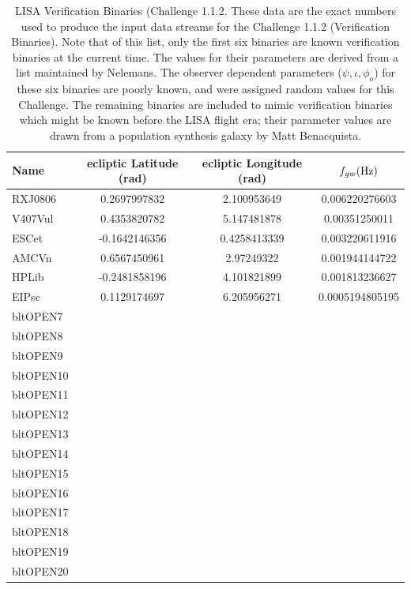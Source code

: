 \documentclass[11pt]{report}
\begin{document}
\begin{description}
\begin{center}
\begin{table}
\begin{tabular}{|l|c|c|c|}
\hline \textbf{Name} & {\bf ecliptic Latitude (rad)} & {\bf ecliptic
Longitude (rad)} & $f_{gw} ({\rm Hz})$  \\
\hline 
RXJ0806   & 0.2697997832   &  2.100953649   &   0.006220276603  \\
V407Vul   & 0.4353820782   &  5.147481878   &   0.00351250011   \\
ESCet   & -0.1642146356   & 0.4258413339   &   0.003220611916   \\
AMCVn   & 0.6567450961   &   2.97249322   &   0.001944144722   \\
HPLib   & -0.2481858196   &  4.101821899   &  0.001813236627   \\
EIPsc   & 0.1129174697   &  6.205956271   &  0.0005194805195   \\
\hline
bltOPEN7 & & & \\
bltOPEN8 & & & \\
bltOPEN9 & & & \\
bltOPEN10 & & & \\
bltOPEN11 & & & \\
bltOPEN12 & & & \\
bltOPEN13 & & & \\
bltOPEN14 & & & \\
bltOPEN15 & & & \\
bltOPEN16 & & & \\
bltOPEN17 & & & \\
bltOPEN18 & & & \\
bltOPEN19 & & & \\
bltOPEN20 & & & \\
\hline
\end{tabular}
    \caption{LISA Verification Binaries (Challenge 1.1.2.  
    These data are the exact numbers
    used to produce the input data streams for the Challenge 1.1.2
    (Verification Binaries).  Note that of this list, only the first six
    binaries are known verification binaries at the current time.  The
    values for their parameters are derived from a list maintained by
    Nelemans\cite{NelemansWiki}.  The observer dependent parameters
    ($\psi, \iota, \phi_{o}$) for these six binaries are poorly known, and
    were assigned random values for this Challenge.
     The remaining binaries are included to mimic
    verification binaries which might be known before the LISA flight era;
    their parameter values are drawn from a population synthesis galaxy by
    Matt Benacquista.}
\label{tbl.LISAbinaries1.1.2}
\end{table}
\end{center}


\end{description}
\end{document}
